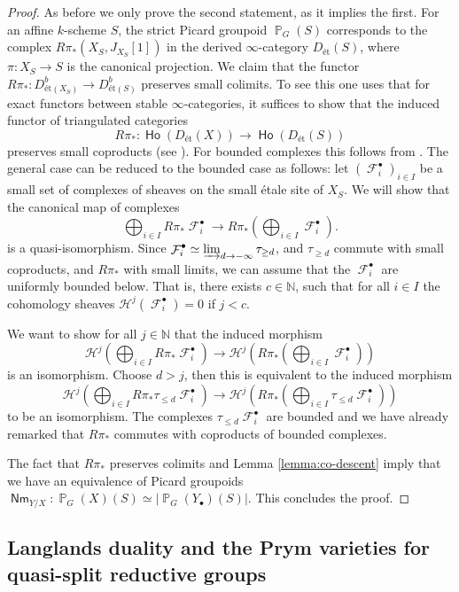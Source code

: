 \documentclass{article}
\DeclareMathOperator{\Ho}{\mathsf{Ho}}
\newcommand{\Hc}{\mathcal{H}}
\DeclareMathOperator{\Pb}{\mathbb{P}}
\DeclareMathOperator{\F}{\mathcal{F}}
\DeclareMathOperator{\Nm}{\mathsf{Nm}}
\theoremstyle{definition}
\theoremstyle{plain}
\begin{document}
\begin{proof}
As before we only prove the second statement, as it implies the first. For an affine $k$-scheme $S$, the strict Picard groupoid $\Pb_G(S)$ corresponds to the complex $R\pi_*(X_S,J_{X_S}[1])$ in the derived $\infty$-category $D_{\text{\'et}}(S)$, where $\pi\colon X_S \to S$ is the canonical projection. We claim that the functor $R\pi_*\colon D^b_{\text{\'et}(X_S)} \to D^b_{\text{\'et}(S)}$ preserves small colimits. To see this one uses that for exact functors between stable $\infty$-categories, it suffices to show that the induced functor of triangulated categories
$$R\pi_*\colon \Ho(D_{\text{\'et}}(X)) \to \Ho(D_{\text{\'et}}(S))$$
preserves small coproducts (see \cite[Proposition 1.4.4.1(2)]{Lurie:ha}). For bounded complexes this follows from \cite[Tag 0739]{stacks-project}. The general case can be reduced to the bounded case as follows: let $(\F^{\bullet}_i)_{i \in I}$ be a small set of complexes of sheaves on the small \'etale site of $X_S$. We will show that the canonical map of complexes
$$\bigoplus_{i \in I} R\pi_* \F_i^{\bullet} \to R\pi_*\left(\bigoplus_{i \in I}\F_i^{\bullet}\right).$$
is a quasi-isomorphism. Since $\F_i^{\bullet} \simeq \varinjlim_{d \to -\infty} \tau_{\geq d}$, and $\tau_{\geq d}$ commute with small coproducts, and $R\pi_*$ with small limits, we can assume that the $\F^{\bullet}_i$ are uniformly bounded below. That is, there exists $c \in \mathbb{N}$, such that for all $i \in I$ the cohomology sheaves $\Hc^j(\F_i^{\bullet}) = 0$ if $j < c$.

We want to show for all $j \in \mathbb{N}$ that the induced morphism
$$\Hc^j\left(\bigoplus_{i \in I} R\pi_* \F_i^{\bullet}\right) \to \Hc^j\left(R\pi_*(\bigoplus_{i \in I}\F_i^{\bullet})\right)$$
is an isomorphism. Choose $d > j$, then this is equivalent to the induced morphism 
$$\Hc^j\left(\bigoplus_{i \in I} R\pi_*\tau_{\leq d} \F_i^{\bullet}\right) \to \Hc^j\left(R\pi_*(\bigoplus_{i \in I}\tau_{\leq d}\F_i^{\bullet})\right)$$
to be an isomorphism. The complexes $\tau_{\leq d} \F_i^{\bullet}$ are bounded and we have already remarked that $R\pi_*$ commutes with coproducts of bounded complexes.


The fact that $R\pi_*$ preserves colimits and Lemma \ref{lemma:co-descent} imply that we have an equivalence of Picard groupoids
$\Nm_{Y/X}\colon \Pb_G(X)(S) \simeq |\Pb_G(Y_{\bullet})(S)|.$
This concludes the proof.
\end{proof}

\subsection{Langlands duality and the Prym varieties for quasi-split reductive groups}
\end{document}
